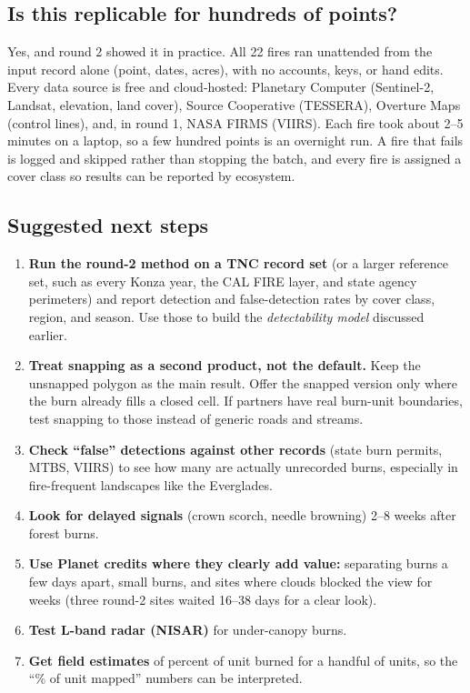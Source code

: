 \documentclass[
]{article}
\providecommand{\tightlist}{%
  \setlength{\itemsep}{0pt}\setlength{\parskip}{0pt}}
\begin{document}
\subsection{Is this replicable for hundreds of
points?}\label{is-this-replicable-for-hundreds-of-points}

Yes, and round 2 showed it in practice. All 22 fires ran unattended from
the input record alone (point, dates, acres), with no accounts, keys, or
hand edits. Every data source is free and cloud-hosted: Planetary
Computer (Sentinel-2, Landsat, elevation, land cover), Source
Cooperative (TESSERA), Overture Maps (control lines), and, in round 1,
NASA FIRMS (VIIRS). Each fire took about 2--5 minutes on a laptop, so a
few hundred points is an overnight run. A fire that fails is logged and
skipped rather than stopping the batch, and every fire is assigned a
cover class so results can be reported by ecosystem.

\subsection{Suggested next steps}\label{suggested-next-steps}

\begin{enumerate}
\def\labelenumi{\arabic{enumi}.}
\tightlist
\item
  \textbf{Run the round-2 method on a TNC record set} (or a larger
  reference set, such as every Konza year, the CAL FIRE layer, and state
  agency perimeters) and report detection and false-detection rates by
  cover class, region, and season. Use those to build the
  \emph{detectability model} discussed earlier.
\item
  \textbf{Treat snapping as a second product, not the default.} Keep the
  unsnapped polygon as the main result. Offer the snapped version only
  where the burn already fills a closed cell. If partners have real
  burn-unit boundaries, test snapping to those instead of generic roads
  and streams.
\item
  \textbf{Check ``false'' detections against other records} (state burn
  permits, MTBS, VIIRS) to see how many are actually unrecorded burns,
  especially in fire-frequent landscapes like the Everglades.
\item
  \textbf{Look for delayed signals} (crown scorch, needle browning) 2--8
  weeks after forest burns.
\item
  \textbf{Use Planet credits where they clearly add value:} separating
  burns a few days apart, small burns, and sites where clouds blocked
  the view for weeks (three round-2 sites waited 16--38 days for a clear
  look).
\item
  \textbf{Test L-band radar (NISAR)} for under-canopy burns.
\item
  \textbf{Get field estimates} of percent of unit burned for a handful
  of units, so the ``\% of unit mapped'' numbers can be interpreted.
\end{enumerate}
\end{document}
